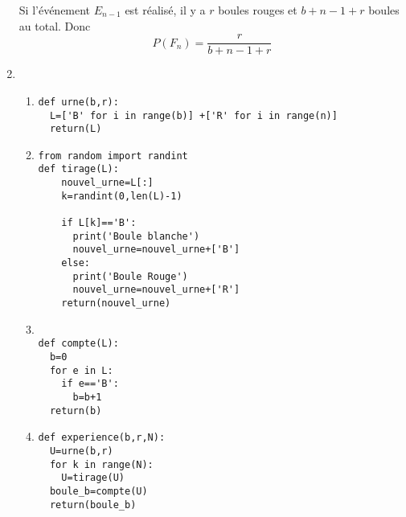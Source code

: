 \documentclass[a4paper, 11pt,reqno]{article}
\begin{document}
\begin{exercice}
\begin{correction}
\begin{enumerate}
Si l'événement $E_{n-1}$ est réalisé, il y a  $r$ boules rouges et $b+n-1+r$ boules au total. 
Donc 
$$P(F_n) = \frac{r}{b+n-1+r}$$

\item \begin{enumerate}
\item
\begin{lstlisting}
def urne(b,r):
  L=['B' for i in range(b)] +['R' for i in range(n)]
  return(L)
\end{lstlisting}

\item
\begin{lstlisting}
from random import randint
def tirage(L):
	nouvel_urne=L[:]
	k=randint(0,len(L)-1)
	
	if L[k]=='B':
	  print('Boule blanche')
	  nouvel_urne=nouvel_urne+['B']
	else:
	  print('Boule Rouge')
	  nouvel_urne=nouvel_urne+['R']
	return(nouvel_urne)
\end{lstlisting}

\item 
\begin{lstlisting}

def compte(L):
  b=0
  for e in L:
    if e=='B':
      b=b+1
  return(b)
\end{lstlisting}

\item 
\begin{lstlisting}
def experience(b,r,N):
  U=urne(b,r)
  for k in range(N):
    U=tirage(U)
  boule_b=compte(U)
  return(boule_b)
    
\end{lstlisting}

\end{enumerate}

\end{enumerate}

\end{correction}


\end{exercice}
\end{document}
